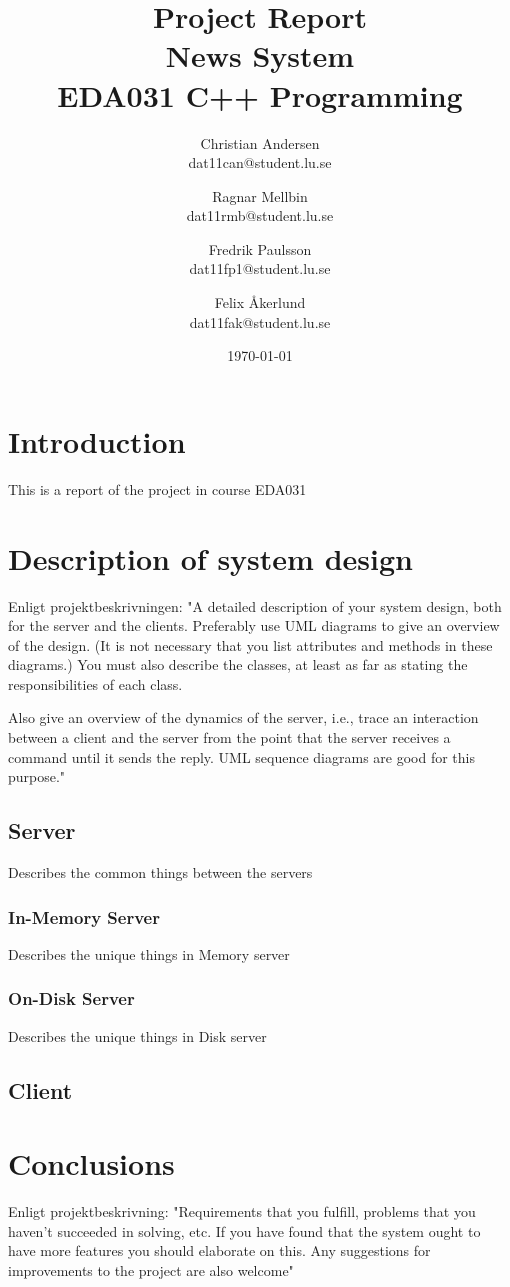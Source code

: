 \documentclass[a4paper]{article}
\title{Project Report \\ News System  \\ EDA031 C++ Programming}
\date{\today}
\author{Christian Andersen \\ dat11can@student.lu.se \and Ragnar Mellbin \\ dat11rmb@student.lu.se \and Fredrik Paulsson \\ dat11fp1@student.lu.se
\and Felix Åkerlund \\ dat11fak@student.lu.se}
\begin{document}
\maketitle


\section{Introduction}

This is a report of the project in course EDA031

\section{Description of system design}

Enligt projektbeskrivningen:
"A detailed description of your system design, both for the server and the clients. Preferably
use UML diagrams to give an overview of the design. (It is not necessary that you list
attributes and methods in these diagrams.) You must also describe the classes, at least as
far as stating the responsibilities of each class.


Also give an overview of the dynamics of the server, i.e., trace an interaction between a
client and the server from the point that the server receives a command until it sends the
reply. UML sequence diagrams are good for this purpose."

\subsection{Server}

Describes the common things between the servers 

\subsubsection{In-Memory Server}

Describes the unique things in Memory server


\subsubsection{On-Disk Server}


Describes the unique things in Disk server


\subsection{Client}


\section{Conclusions}

Enligt projektbeskrivning: 
"Requirements that you fulfill, problems that you haven’t succeeded in solving,
etc. If you have found that the system ought to have more features you should elaborate on
this. Any suggestions for improvements to the project are also welcome"
\end{document}

